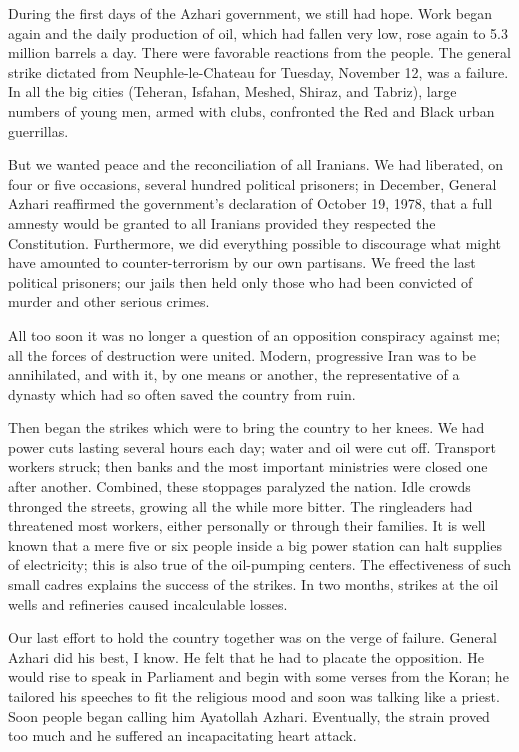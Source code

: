 During the first days of the Azhari government, we still had hope. Work began again and the daily production of oil, which had fallen very low, rose again to 5.3 million barrels a day. There were favorable reactions from the people. The general strike dictated from Neuphle-le-Chateau for Tuesday, November 12, was a failure. In all the big cities (Teheran, Isfahan, Meshed, Shiraz, and Tabriz), large numbers of young men, armed with clubs, confronted the Red and Black urban guerrillas. 

But we wanted peace and the reconciliation of all Iranians. We had liberated, on four or five occasions, several hundred political prisoners; in December, General Azhari reaffirmed the government's declaration of October 19, 1978, that a full amnesty would be granted to all Iranians provided they respected the Constitution. Furthermore, we did everything possible to discourage what might have amounted to counter-terrorism by our own partisans. We freed the last political prisoners; our jails then held only those who had been convicted of murder and other serious crimes. 

All too soon it was no longer a question of an opposition conspiracy against me; all the forces of destruction were united. Modern, progressive Iran was to be annihilated, and with it, by one means or another, the representative of a dynasty which had so often saved the country from ruin. 

Then began the strikes which were to bring the country to her knees. We had power cuts lasting several hours each day; water and oil were cut off. Transport workers struck; then banks and the most important ministries were closed one after another. Combined, these stoppages paralyzed the nation. Idle crowds thronged the streets, growing all the while more bitter. The ringleaders had threatened most workers, either personally or through their families. It is well known that a mere five or six people inside a big power station can halt supplies of electricity; this is also true of the oil-pumping centers. The effectiveness of such small cadres explains the success of the strikes. In two months, strikes at the oil wells and refineries caused incalculable losses. 

Our last effort to hold the country together was on the verge of failure. General Azhari did his best, I know. He felt that he had to placate the opposition. He would rise to speak in Parliament and begin with some verses from the Koran; he tailored his speeches to fit the religious mood and soon was talking like a priest. Soon people began calling him Ayatollah Azhari. Eventually, the strain proved too much and he suffered an incapacitating heart attack. 

